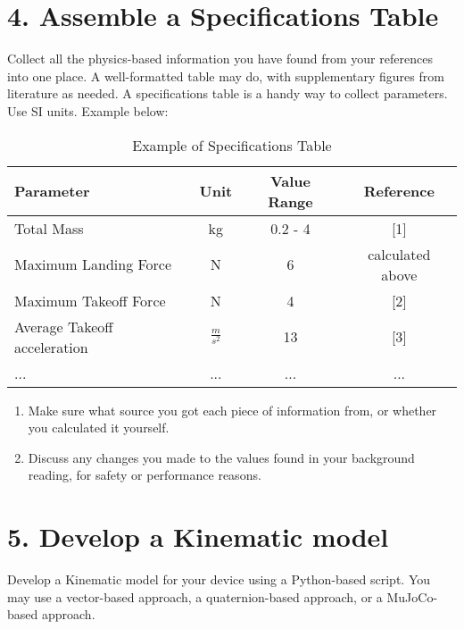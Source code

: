 \documentclass[12pt]{article}
\begin{document}
\section*{4. Assemble a Specifications Table}
Collect all the physics-based information you have found from your references into one place. A well-formatted table may do, with supplementary figures from literature as needed. A specifications table is a handy way to collect parameters. Use SI units. Example below:

\begin{table}[h]
\centering
\begin{tabular}{|l|c|c|c|}
\hline
\textbf{Parameter} & \textbf{Unit} & \textbf{Value Range} & \textbf{Reference} \\
\hline
Total Mass & kg & 0.2 - 4 & [1] \\
Maximum Landing Force & N & 6 & calculated above \\
Maximum Takeoff Force & N & 4 & [2] \\
Average Takeoff acceleration & $\frac{m}{s^2}$ & 13 & [3] \\
... & ... & ... & ... \\
\hline
\end{tabular}
\caption{Example of Specifications Table}
\end{table}

\begin{enumerate}
    \item Make sure what source you got each piece of information from, or whether you calculated it yourself.
    \item Discuss any changes you made to the values found in your background reading, for safety or performance reasons.
\end{enumerate}




\section*{5. Develop a Kinematic model}
Develop a Kinematic model for your device using a Python-based script. You may use a vector-based approach, a quaternion-based approach, or a MuJoCo-based approach.

\begin{center}
\end{center}
\end{document}
